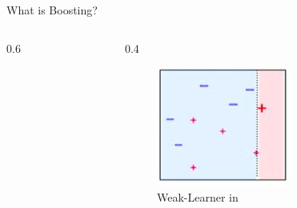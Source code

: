 \documentclass{beamer}
\begin{document}
\begin{frame}{What is Boosting?}
\begin{center}
\begin{columns}
\begin{column}{0.6\hsize}
            \end{column}
            \begin{column}{0.4\hsize}
                \begin{figure}
                    \centering
                    \includegraphics[width=0.8\linewidth]{images/weaklearner.JPG}
                    \caption{\small Weak-Learner in \cite{MultiAna}}
                    \label{fig:example}
                \end{figure}
            \end{column}
        \end{columns}
    \end{center}
\end{frame}
\end{document}

